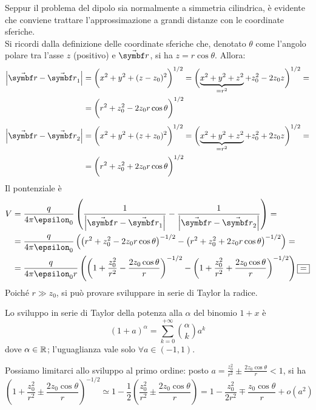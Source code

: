 Seppur il problema del dipolo sia normalmente a simmetria cilindrica, è evidente che conviene trattare l'approssimazione a grandi distanze con le coordinate sferiche.\\
Si ricordi dalla definizione delle coordinate sferiche che, denotato $\theta$ come l'angolo polare tra l'asse $z$ (positivo) e $\vba{r}$, si ha $z=r\cos\theta$. Allora:
\begin{align*}
	\abs{\vba{r}-\vba{r}_1}&=\biggl(x^2+y^2+(z-z_0)^2\biggr)^{1/2}=\biggl(\underbrace{x^2+y^2+z^2}_{=r^2}+z_0^2-2z_0z\biggr)^{1/2}=\\
	&=\biggl(r^2+z_0^2-2z_0r\cos\theta\biggr)^{1/2}
\end{align*}
\begin{align*}
	\abs{\vba{r}-\vba{r}_2}&=\biggl(x^2+y^2+(z+z_0)^2\biggr)^{1/2}=\biggl(\underbrace{x^2+y^2+z^2}_{=r^2}+z_0^2+2z_0z\biggr)^{1/2}=\\
	&=\biggl(r^2+z_0^2+2z_0r\cos\theta\biggr)^{1/2}
\end{align*}
Il pontenziale è
\begin{align*}
	V&=\frac{q}{4\pi\epsilon_0}\left(\frac{1}{\abs{\vba{r}-\vba{r}_1}}-\frac{1}{\abs{\vba{r}-\vba{r}_2}}\right)=\\
	&=\frac{q}{4\pi\epsilon_0}\left(\left(r^2+z_0^2-2z_0r\cos\theta\right)^{-1/2}-\left(r^2+z_0^2+2z_0r\cos\theta\right)^{-1/2}\right)=\\
	&=\frac{q}{4\pi\epsilon_0r}\left(\left(1+\frac{z_0^2}{r^2}-\frac{2z_0\cos\theta}{r}\right)^{-1/2}-\left(1+\frac{z_0^2}{r^2}+\frac{2z_0\cos\theta}{r}\right)^{-1/2}\right)\squarequal
\end{align*}
Poiché $r\gg z_0$, si può provare sviluppare in serie di Taylor la radice.
\begin{remember}
	Lo sviluppo in serie di Taylor della potenza alla $\alpha$ del binomio $1+x$ è
	\begin{equation}
		 \left(1+a\right)^\alpha=\sum_{k=0}^{+\infty}\binom{\alpha}{k}a^k
	\end{equation}
dove $\alpha\in\mathbb{R}$; l'uguaglianza vale solo $\forall a\in\left(-1,1\right)$.
\end{remember}
Possiamo limitarci allo sviluppo al primo ordine: posto $a=\frac{z_0^2}{r^2}\pm\frac{2z_0\cos\theta}{r}<1$, si ha
 \begin{equation*}
 	\left(1+\frac{z_0^2}{r^2}\pm\frac{2z_0\cos\theta}{r}\right)^{-1/2}\simeq1-\frac{1}{2}\left(\frac{z_0^2}{r^2}\pm\frac{2z_0\cos\theta}{r}\right)=1-\frac{z_0^2}{2r^2}\mp\frac{z_0\cos\theta}{r}+o(a^2)
 \end{equation*}
